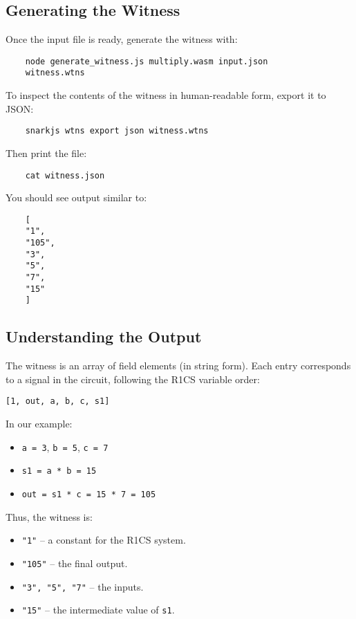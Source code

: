 \documentclass{article}
\begin{document}
\subsection*{Generating the Witness}

Once the input file is ready, generate the witness with:

\begin{verbatim}
	node generate_witness.js multiply.wasm input.json 
	witness.wtns
\end{verbatim}

To inspect the contents of the witness in human-readable form, export it to JSON:

\begin{verbatim}
	snarkjs wtns export json witness.wtns
\end{verbatim}

Then print the file:

\begin{verbatim}
	cat witness.json
\end{verbatim}

You should see output similar to:

\begin{verbatim}
	[
	"1",
	"105",
	"3",
	"5",
	"7",
	"15"
	]
\end{verbatim}

\subsection*{Understanding the Output}

The witness is an array of field elements (in string form). Each entry corresponds to a signal in the circuit, following the R1CS variable order:

\begin{center}
	\texttt{[1, out, a, b, c, s1]}
\end{center}

In our example:
\begin{itemize}
	\item \texttt{a = 3}, \texttt{b = 5}, \texttt{c = 7}
	\item \texttt{s1 = a * b = 15}
	\item \texttt{out = s1 * c = 15 * 7 = 105}
\end{itemize}

Thus, the witness is:

\begin{itemize}
	\item \texttt{"1"} – a constant for the R1CS system.
	\item \texttt{"105"} – the final output.
	\item \texttt{"3", "5", "7"} – the inputs.
	\item \texttt{"15"} – the intermediate value of \texttt{s1}.
\end{itemize}
\end{document}
